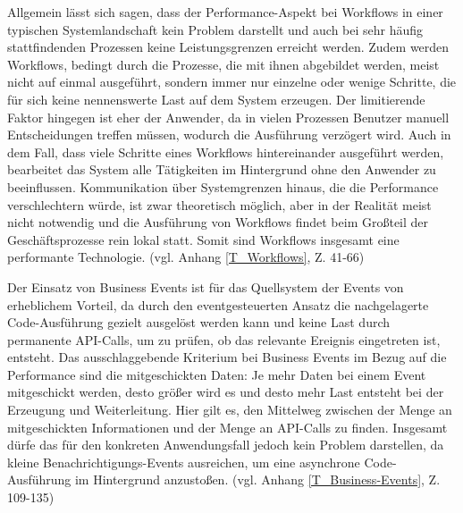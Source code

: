 Allgemein lässt sich sagen, dass der Performance-Aspekt bei Workflows in einer typischen Systemlandschaft kein Problem darstellt und auch bei sehr häufig stattfindenden Prozessen keine Leistungsgrenzen erreicht werden. Zudem werden Workflows, bedingt durch die Prozesse, die mit ihnen abgebildet werden, meist nicht auf einmal ausgeführt, sondern immer nur einzelne oder wenige Schritte, die für sich keine nennenswerte Last auf dem System erzeugen. Der limitierende Faktor hingegen ist eher der Anwender, da in vielen Prozessen Benutzer manuell Entscheidungen treffen müssen, wodurch die Ausführung verzögert wird. Auch in dem Fall, dass viele Schritte eines Workflows hintereinander ausgeführt werden, bearbeitet das System alle Tätigkeiten im Hintergrund ohne den Anwender zu beeinflussen. Kommunikation über Systemgrenzen hinaus, die die Performance verschlechtern würde, ist zwar theoretisch möglich, aber in der Realität meist nicht notwendig und die Ausführung von Workflows findet beim Gro{\ss}teil der Geschäftsprozesse rein lokal statt. Somit sind Workflows insgesamt eine performante Technologie. (vgl. Anhang \ref{T_Workflows}, Z. 41-66)

Der Einsatz von Business Events ist für das Quellsystem der Events von erheblichem Vorteil, da durch den eventgesteuerten Ansatz die nachgelagerte Code-Ausführung gezielt ausgelöst werden kann und keine Last durch permanente API-Calls, um zu prüfen, ob das relevante Ereignis eingetreten ist, entsteht. Das ausschlaggebende Kriterium bei Business Events im Bezug auf die Performance sind die mitgeschickten Daten: Je mehr Daten bei einem Event mitgeschickt werden, desto grö{\ss}er wird es und desto mehr Last entsteht bei der Erzeugung und Weiterleitung. Hier gilt es, den Mittelweg zwischen der Menge an mitgeschickten Informationen und der Menge an API-Calls zu finden. Insgesamt dürfe das für den konkreten Anwendungsfall jedoch kein Problem darstellen, da kleine Benachrichtigungs-Events ausreichen, um eine asynchrone Code-Ausführung im Hintergrund anzusto{\ss}en. (vgl. Anhang \ref{T_Business-Events}, Z. 109-135)


